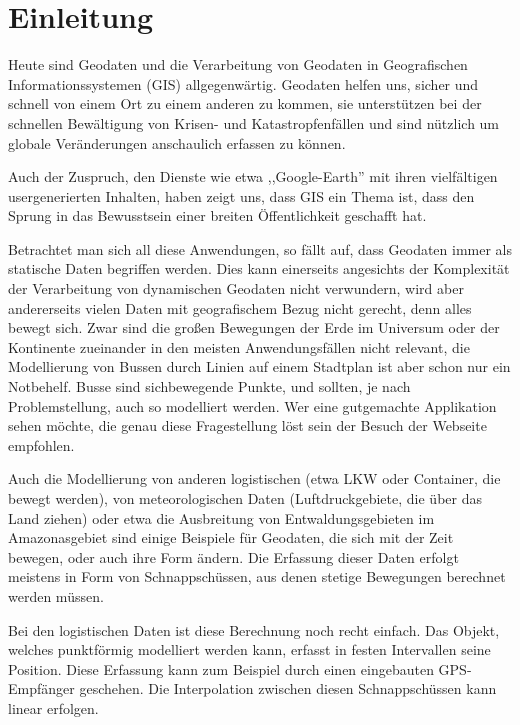 
\chapter[Einleitung \anmerkung{ca. 5 Seiten}]{Einleitung} \label{Kapitel1}


Heute sind Geodaten und die Verarbeitung von Geodaten in Geografischen Informationssystemen (GIS) allgegenwärtig. Geodaten helfen uns, sicher und schnell von einem Ort zu einem anderen zu kommen, sie unterstützen bei der schnellen Bewältigung von Krisen- und Katastropfenfällen und sind nützlich um globale Veränderungen anschaulich erfassen zu können.

Auch der Zuspruch, den Dienste wie etwa ,,Google-Earth'' mit ihren vielfältigen usergenerierten Inhalten, haben zeigt uns, dass GIS ein Thema ist, dass den Sprung in das Bewusstsein einer breiten Öffentlichkeit geschafft hat. 

Betrachtet man sich all diese Anwendungen, so fällt auf, dass Geodaten immer als statische Daten begriffen werden. Dies kann einerseits angesichts der Komplexität der Verarbeitung von dynamischen Geodaten nicht verwundern, wird aber andererseits vielen Daten mit geografischem Bezug nicht gerecht, denn alles bewegt sich. Zwar sind die großen Bewegungen der Erde im Universum oder der Kontinente zueinander in den meisten Anwendungsfällen nicht relevant, die Modellierung von Bussen durch Linien auf einem Stadtplan ist aber schon nur ein Notbehelf. Busse sind sichbewegende Punkte, und sollten, je nach Problemstellung, auch so modelliert werden. Wer eine gutgemachte Applikation sehen möchte, die genau diese Fragestellung löst sein der Besuch der Webseite \cite{swR} empfohlen.

Auch die Modellierung von anderen logistischen (etwa LKW oder Container, die bewegt werden), von meteorologischen Daten (Luftdruckgebiete, die über das Land ziehen) oder etwa die Ausbreitung von Entwaldungsgebieten im Amazonasgebiet sind einige Beispiele für Geodaten, die sich mit der Zeit bewegen, oder auch ihre Form ändern. Die Erfassung dieser  Daten erfolgt meistens in Form von Schnappschüssen, aus denen stetige Bewegungen berechnet werden müssen. 

Bei den logistischen Daten ist diese Berechnung noch recht einfach. Das Objekt, welches punktförmig modelliert werden kann, erfasst in festen Intervallen seine Position. Diese Erfassung kann zum Beispiel durch einen eingebauten GPS-Empfänger geschehen. Die Interpolation zwischen diesen Schnappschüssen kann linear erfolgen. 


